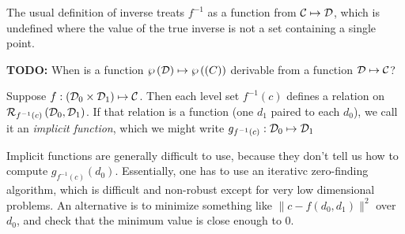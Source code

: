 The usual definition of inverse treats $f^{-1}$
as a function from $\mathcal{C} \mapsto \mathcal{D}$,
which is undefined where the value of the true
inverse is not a set containing a single point.

\textbf{TODO:} When is a function 
$ \wp \left( \mathcal{D} \right)   \mapsto  \wp \left( \mathcal{(}C) \right) $
derivable from a function $\mathcal{D} \mapsto \mathcal{C}$?

\label{sec:Implicit-functions}

Suppose 
$f : \left( \mathcal{D}_0 \times \mathcal{D}_1 \right) \mapsto \mathcal{C}$.
Then each level set $f^{-1}\left( c \right)$ defines a relation on 
$\mathcal{R}_{f^{-1}(c)} \left( \mathcal{D}_0 , \mathcal{D}_1 \right)$.
If that relation is a function
(one $d_1$ paired to each $d_0$),
we call it an \textit{implicit function},
which we might write $g_{f^{-1}(c)} : \mathcal{D}_0 \mapsto \mathcal{D}_1$

Implicit functions are generally difficult to use,
because they don't tell us how to compute 
$g_{f^{-1}(c)} \left( d_0 \right)$.
Essentially, one has to use an iterativc zero-finding 
algorithm, which is difficult and non-robust except
for very low dimensional problems.
An alternative is to minimize something like
$\| c - f\left( d_0, d_1 \right) \|^2$ over $d_0$,
and check that the minimum value is close enough to $0$.







